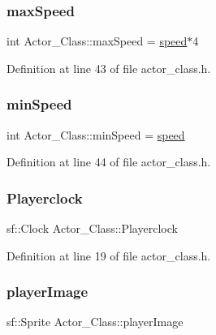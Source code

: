 \subsubsection{\texorpdfstring{max\+Speed}{maxSpeed}}
{\footnotesize\ttfamily int Actor\+\_\+\+Class\+::max\+Speed = \hyperlink{class_actor___class_af833d1fff0db17c4e797836ffbae9f9e}{speed}$\ast$4}



Definition at line 43 of file actor\+\_\+class.\+h.

\hypertarget{class_actor___class_ab3e44e44838da370bb07cfe647cbd2d3}{}\label{class_actor___class_ab3e44e44838da370bb07cfe647cbd2d3} 
\subsubsection{\texorpdfstring{min\+Speed}{minSpeed}}
{\footnotesize\ttfamily int Actor\+\_\+\+Class\+::min\+Speed = \hyperlink{class_actor___class_af833d1fff0db17c4e797836ffbae9f9e}{speed}}



Definition at line 44 of file actor\+\_\+class.\+h.

\hypertarget{class_actor___class_a681f9193b51429a1c2c213e7627f9185}{}\label{class_actor___class_a681f9193b51429a1c2c213e7627f9185} 
\subsubsection{\texorpdfstring{Playerclock}{Playerclock}}
{\footnotesize\ttfamily sf\+::\+Clock Actor\+\_\+\+Class\+::\+Playerclock}



Definition at line 19 of file actor\+\_\+class.\+h.

\hypertarget{class_actor___class_abbef9a0bb9fe8451b95ab7dca366b777}{}\label{class_actor___class_abbef9a0bb9fe8451b95ab7dca366b777} 
\subsubsection{\texorpdfstring{player\+Image}{playerImage}}
{\footnotesize\ttfamily sf\+::\+Sprite Actor\+\_\+\+Class\+::player\+Image}



